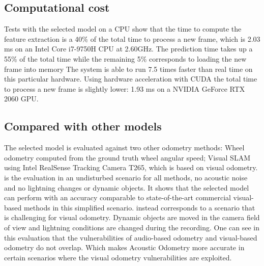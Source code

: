 \begin{figure*}
    \centering
\end{figure*}

\subsection{Computational cost} Tests with the selected model on a CPU show that
the time to compute the feature extraction is a 40\% of the total time to
process a new frame, which is 2.03 ms on an Intel\textregistered{}
Core\texttrademark{} i7-9750H CPU at 2.60GHz. The prediction time takes up a
55\% of the total time while the remaining 5\% corresponds to loading the new
frame into memory The system is able to run 7.5 times faster than real time on
this particular hardware. Using hardware acceleration with CUDA the total time
to process a new frame is slightly lower: 1.93 ms on a NVIDIA GeForce RTX
2060 GPU.

\subsection{Compared with other models} The selected model is evaluated against
two other odometry methods: Wheel odometry computed from the ground truth wheel
angular speed; Visual SLAM using Intel\textregistered{}
RealSense\texttrademark{} Tracking Camera T265, which is based on visual
odometry.  is the evaluation in an undisturbed scenario
for all methods, no acoustic noise and no lightning changes or dynamic objects.
It shows that the selected model can perform with an accuracy comparable to
state-of-the-art commercial visual-based methods in this simplified scenario.
 instead corresponds to a scenario that is challenging
for visual odometry. Dynamic objects are moved in the camera field of view and
lightning conditions are changed during the recording. One can see in this
evaluation that the vulnerabilities of audio-based odometry and visual-based
odometry do not overlap. Which makes Acoustic Odometry more accurate in certain
scenarios where the visual odometry vulnerabilities are exploited.

